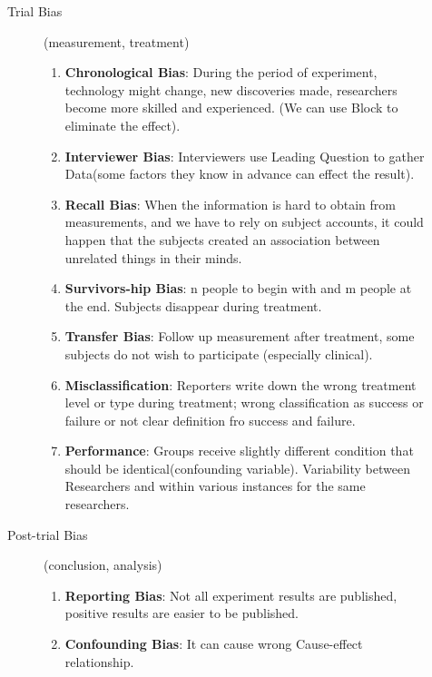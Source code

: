 \begin{description}
\begin{description}
\begin{enumerate}
    \end{enumerate}
    \item[Trial Bias](measurement, treatment)
    \begin{enumerate}
        \item \textbf{Chronological Bias}: During the period of experiment, technology might change, new discoveries made, researchers become more skilled and experienced. (We can use Block to eliminate the effect).
        \item \textbf{Interviewer Bias}: Interviewers use Leading Question to gather Data(some factors they know in advance can effect the result).
        \item \textbf{Recall Bias}: When the information is hard to obtain from measurements, and we have to rely on subject accounts, it could happen that the subjects created an association between unrelated things in their minds.
        \item \textbf{Survivors-hip Bias}: n people to begin with and m people at the end. Subjects disappear during treatment.
        \item \textbf{Transfer Bias}: Follow up measurement after treatment, some subjects do not wish to participate (especially clinical).
        \item \textbf{Misclassification}: Reporters write down the wrong treatment level or type during treatment; wrong classification as success or failure or not clear definition fro success and failure.
        \item \textbf{Performance}: Groups receive slightly different condition that should be identical(confounding variable). Variability between Researchers and within various instances for the same researchers.
        
    \end{enumerate}
    \item[Post-trial Bias](conclusion, analysis)
    \begin{enumerate}
        \item \textbf{Reporting Bias}: Not all experiment results are published, positive results are easier to be published.
        \item \textbf{Confounding Bias}: It can cause wrong Cause-effect relationship.
    \end{enumerate}
\end{description}
    
\end{description}

